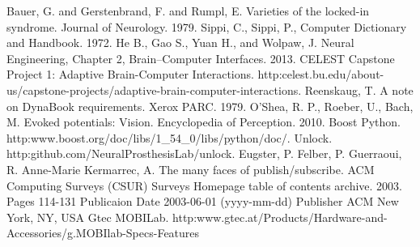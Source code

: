 \documentclass[11pt]{article}
\begin{document}
\begin{thebibliography}{99}
  Bauer, G. and Gerstenbrand, F. and Rumpl, E. Varieties of the locked-in syndrome. Journal of Neurology.  1979.
  Sippi, C.,  Sippi, P., Computer Dictionary and Handbook. 1972. 
  He B., Gao S., Yuan H., and Wolpaw, J.  Neural Engineering, Chapter 2, Brain–Computer Interfaces.  2013.
 CELEST Capstone Project 1: Adaptive Brain-Computer Interactions.  http:\/\/celest.bu.edu/about-us/capstone-projects/adaptive-brain-computer-interactions.
  Reenskaug, T. A note on DynaBook requirements. Xerox PARC.  1979.
 O’Shea, R. P., Roeber, U., Bach, M. Evoked potentials: Vision.  Encyclopedia of Perception. 2010.
 Boost Python.  http:\/\/www.boost.org/doc/libs/1\_54\_0/libs/python/doc/.
 Unlock.  http:\/\/github.com/NeuralProsthesisLab/unlock.
 Eugster, P.  Felber, P.  Guerraoui, R.  Anne-Marie Kermarrec, A.  The many faces of publish/subscribe.  ACM Computing Surveys (CSUR) Surveys Homepage table of contents archive.  2003.
Pages	114-131
Publicaion Date	2003-06-01 (yyyy-mm-dd)
Publisher	ACM New York, NY, USA 
 Gtec MOBILab.  http:\/\/www.gtec.at/Products/Hardware-and-Accessories/g.MOBIlab-Specs-Features

\end{thebibliography}
\end{document}
